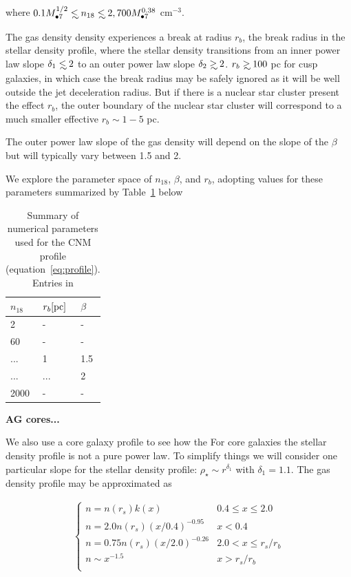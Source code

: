 \documentclass[usenatbib,fleqn]{mn2e}
\newcommand\lsim{\mathrel{\rlap{\lower4pt\hbox{\hskip1pt$\sim$}}
    \raise1pt\hbox{$<$}}}
\newcommand\gsim{\mathrel{\rlap{\lower4pt\hbox{\hskip1pt$\sim$}}
    \raise1pt\hbox{$>$}}}
\newcommand{\Mbh}[1][]{M_{\bullet#1}}
\begin{document}
where $0.1 \Mbh[7]^{1/2} \lsim n_{\rm 18}\lsim 2,700
\Mbh[7]^{0.38} $ cm$^{-3}$.  

The gas density density experiences a break at radius $r_b$, the break
radius in the stellar density profile, where the stellar density
transitions from an inner power law slope $\delta_1\lsim 2$ to an outer
power law slope $\delta_2\gsim 2$. $r_b\gsim 100$ pc for cusp galaxies,
in which case the break radius may be safely ignored as it will be
well outside the jet deceleration radius. But if there is a nuclear
star cluster present the effect $r_b$, the outer boundary of the
nuclear star cluster will correspond to a much smaller effective
$r_b\sim 1-5$ pc. 

The outer power law slope of the gas density will depend on the slope
of the $\beta$ but will typically vary between 1.5 and 2. 

We explore the parameter space of $n_{18}$, $\beta$, and $r_b$,
adopting values for these parameters summarized by
Table~\ref{tab:params} below


\begin{table}
\caption{\label{tab:params} Summary of numerical parameters used for
  the CNM profile (equation~\eqref{eq:profile}). Entries in}
\begin{minipage}{\columnwidth}
\begin{tabular}{|l|l|l|}
$n_{18}$ & $r_b [{\rm pc}]$ & $\beta$\\
\hline
  2     &  -    &  -\\
  60    &  -    &  -\\
  ...   &  1    &  1.5\\
  ...   &  ...   &  2\\
  2000  &  -    &  -\\
\end{tabular}
\end{minipage}
\end{table}


{\bf AG cores...}

We also use a core galaxy profile to see how the For core galaxies the stellar density profile is not a pure power
law. To simplify things we will consider one particular slope for the
stellar density profile:  $\rho_\star\sim r^{\delta_1}$ with
$\delta_1=1.1$. The gas density profile may be approximated as 

\begin{align}
\begin{cases}
n=n(r_s) k(x) & 0.4 \leq x\leq 2.0\\
n = 2.0 n(r_s) (x/0.4)^{-0.95} & x < 0.4\\
n = 0.75 n(r_s) (x/2.0)^{-0.26} & 2.0< x \leq r_s/r_b\\
n \sim x^{-1.5} & x>r_s/r_b\\
\end{cases}
\end{align}
\end{document}
